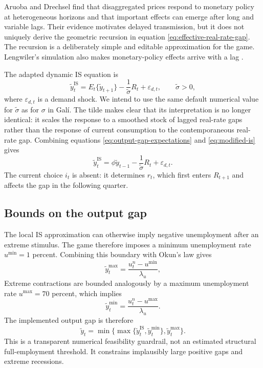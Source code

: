 \documentclass[11pt]{article}
\newcommand{\gap}{\widetilde y}
\begin{document}
Aruoba and Drechsel \cite{aruoba-drechsel2024} find that disaggregated prices
respond to monetary policy at heterogeneous horizons and that important effects
can emerge after long and variable lags.  Their evidence motivates delayed
transmission, but it does not uniquely derive the geometric recursion in
equation \eqref{eq:effective-real-rate-gap}.  The recursion is a deliberately
simple and editable approximation for the game.  Lengwiler's simulation also
makes monetary-policy effects arrive with a lag \cite{lengwiler2004}.

The adapted dynamic IS equation is
\begin{equation}
  \gap_t^{\mathrm{IS}}
  =E_t\{\gap_{t+1}\}-\frac{1}{\widetilde\sigma}R_t
  +\varepsilon_{d,t},
  \qquad \widetilde\sigma>0,
  \label{eq:modified-is}
\end{equation}
where $\varepsilon_{d,t}$ is a demand shock.  We intend to use the same default
numerical value for $\widetilde\sigma$ as for $\sigma$ in Gal\'i.  The tilde
makes clear that its interpretation is no longer identical: it scales the
response to a smoothed stock of lagged real-rate gaps rather than the response
of current consumption to the contemporaneous real-rate gap.  Combining
 equations \eqref{eq:output-gap-expectations} and \eqref{eq:modified-is} gives
\begin{equation}
  \gap_t^{\mathrm{IS}}
  =\phi\gap_{t-1}-\frac{1}{\widetilde\sigma}R_t
  +\varepsilon_{d,t}.
  \label{eq:implemented-is}
\end{equation}
The current choice $i_t$ is absent: it determines $r_t$, which first enters
$R_{t+1}$ and affects the gap in the following quarter.

\subsection{Bounds on the output gap}

The local IS approximation can otherwise imply negative unemployment after an
extreme stimulus.  The game therefore imposes a minimum unemployment rate
$u^{\min}=1$ percent.  Combining this boundary with Okun's law gives
\begin{equation}
  \gap_t^{\max}=\frac{u_t^n-u^{\min}}{\lambda_u},
  \label{eq:maximum-output-gap}
\end{equation}
Extreme contractions are bounded analogously by a maximum unemployment rate
$u^{\max}=70$ percent, which implies
\begin{equation}
  \gap_t^{\min}=\frac{u_t^n-u^{\max}}{\lambda_u}.
  \label{eq:minimum-output-gap}
\end{equation}
The implemented output gap is therefore
\begin{equation}
  \gap_t=\min\{\max\{\gap_t^{\mathrm{IS}},\gap_t^{\min}\},\gap_t^{\max}\}.
  \label{eq:capacity-clipping}
\end{equation}
This is a transparent numerical feasibility guardrail, not an estimated
structural full-employment threshold.  It constrains implausibly large positive
gaps and extreme recessions.
\end{document}
